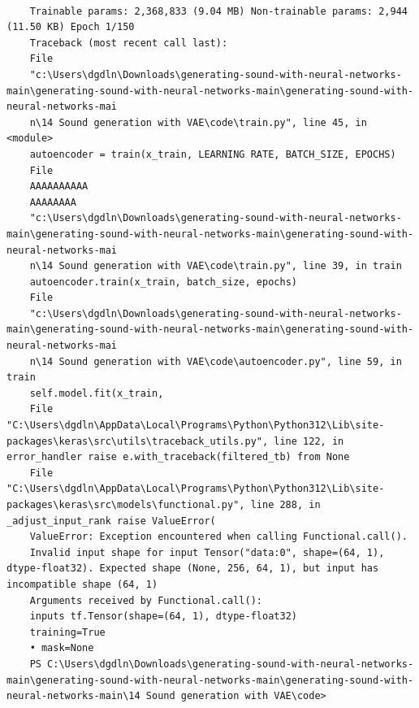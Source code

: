 \documentclass[12pt, a4paper]{article}
\begin{document}
	\vspace*{2\baselineskip}
	\begin{verbatim}
	
	Trainable params: 2,368,833 (9.04 MB) Non-trainable params: 2,944 (11.50 KB) Epoch 1/150
	Traceback (most recent call last):
	File
	"c:\Users\dgdln\Downloads\generating-sound-with-neural-networks-main\generating-sound-with-neural-networks-main\generating-sound-with-neural-networks-mai
	n\14 Sound generation with VAE\code\train.py", line 45, in <module>
	autoencoder = train(x_train, LEARNING RATE, BATCH_SIZE, EPOCHS)
	File
	ΑΑΑΑΑΑΑΑΑΑ
	ΑΑΑΑΑΑΑΑ
	"c:\Users\dgdln\Downloads\generating-sound-with-neural-networks-main\generating-sound-with-neural-networks-main\generating-sound-with-neural-networks-mai
	n\14 Sound generation with VAE\code\train.py", line 39, in train
	autoencoder.train(x_train, batch_size, epochs)
	File
	"c:\Users\dgdln\Downloads\generating-sound-with-neural-networks-main\generating-sound-with-neural-networks-main\generating-sound-with-neural-networks-mai
	n\14 Sound generation with VAE\code\autoencoder.py", line 59, in train
	self.model.fit(x_train,
	File "C:\Users\dgdln\AppData\Local\Programs\Python\Python312\Lib\site-packages\keras\src\utils\traceback_utils.py", line 122, in error_handler raise e.with_traceback(filtered_tb) from None
	File "C:\Users\dgdln\AppData\Local\Programs\Python\Python312\Lib\site-packages\keras\src\models\functional.py", line 288, in _adjust_input_rank raise ValueError(
	ValueError: Exception encountered when calling Functional.call().
	Invalid input shape for input Tensor("data:0", shape=(64, 1), dtype-float32). Expected shape (None, 256, 64, 1), but input has incompatible shape (64, 1)
	Arguments received by Functional.call():
	inputs tf.Tensor(shape=(64, 1), dtype-float32)
	training=True
	• mask=None
	PS C:\Users\dgdln\Downloads\generating-sound-with-neural-networks-main\generating-sound-with-neural-networks-main\generating-sound-with-neural-networks-main\14 Sound generation with VAE\code>
	\end{verbatim}
	
\end{document}
